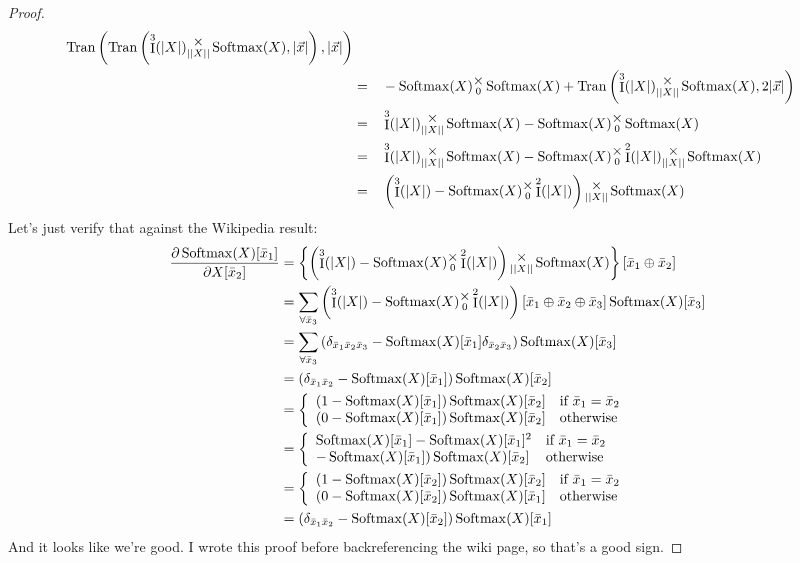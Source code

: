 \documentclass[12pt]{book}
\theoremstyle{definition}
\theoremstyle{plain}
\theoremstyle{ppart}
\theoremstyle{case}
\theoremstyle{solution}
\DeclareMathOperator{\Ident}{I}
\DeclareMathOperator{\Tran}{Tran}
\DeclareMathOperator{\Softmax}{Softmax}
\newcommand{\mmult}[1]{\text{\raisebox{1ex}{$\underset{#1}{\times}$}}}
\begin{document}
\begin{landscape}
\begin{proof}
\begin{alignat}{3}
	\Tran\left(
		\Tran\left(
			\Ident^3(|X|) \mmult{||X||} \Softmax(X)
		,|\vec{x}|
		\right)
	,|\vec{x}|
	\right) \\
	&=&&
	-\Softmax(X) \mmult{0} \Softmax(X)
	+
	\Tran\left(
		\Ident^3(|X|) \mmult{||X||} \Softmax(X)
		,2|\vec{x}|
	\right) \\
	&=&&
	\Ident^3(|X|) \mmult{||X||} \Softmax(X)
  -\Softmax(X) \mmult{0} \Softmax(X) \\
	&=&&
	\Ident^3(|X|) \mmult{||X||} \Softmax(X)
	-\Softmax(X) \mmult{0} \Ident^2(|X|) \mmult{||X||} \Softmax(X) \\
	&=&&
	\left(\Ident^3(|X|) - \Softmax(X) \mmult{0} \Ident^2(|X|) \right)
	\mmult{||X||} \Softmax(X)
\end{alignat}
Let's just verify that against the Wikipedia \cite{wiki:softmax} result:
\begin{align*}
	\frac{\partial \Softmax(X)[\bar{x}_1]}{\partial X[\bar{x}_2]}
	&=
	\left\{
		\left(\Ident^3(|X|) - \Softmax(X) \mmult{0} \Ident^2(|X|) \right)
		\mmult{||X||} \Softmax(X)
	\right\}
	[\bar{x}_1 \oplus \bar{x}_2] \\
	&=
	\sum_{\forall \bar{x}_3}
	\left(\Ident^3(|X|) - \Softmax(X) \mmult{0} \Ident^2(|X|) \right)
	[\bar{x}_1 \oplus \bar{x}_2 \oplus \bar{x}_3]
	\Softmax(X)[\bar{x}_3] \\
	&=
	\sum_{\forall \bar{x}_3}
	\left(
		\delta_{\bar{x}_1 \bar{x}_2 \bar{x}_3}
		- \Softmax(X)[\bar{x}_1] \delta_{\bar{x}_2 \bar{x}_3}
	\right)
	\Softmax(X)[\bar{x}_3] \\
	&=
	(\delta_{\bar{x}_1 \bar{x}_2} - \Softmax(X)[\bar{x}_1])
	\Softmax(X)[\bar{x}_2] \\
	&= \left\{
  \begin{array}{ll}
    (1-\Softmax(X)[\bar{x}_1])\Softmax(X)[\bar{x}_2]
			& \mbox{if } \bar{x}_1 = \bar{x}_2 \\
    (0-\Softmax(X)[\bar{x}_1])\Softmax(X)[\bar{x}_2]
			& \mbox{otherwise}
  \end{array}
	\right. \\
	&= \left\{
  \begin{array}{ll}
    \Softmax(X)[\bar{x}_1]-\Softmax(X)[\bar{x}_1]^2
			& \mbox{if } \bar{x}_1 = \bar{x}_2 \\
    -\Softmax(X)[\bar{x}_1])\Softmax(X)[\bar{x}_2]
			& \mbox{otherwise}
  \end{array}
	\right. \\
	&= \left\{
  \begin{array}{ll}
    (1-\Softmax(X)[\bar{x}_2])\Softmax(X)[\bar{x}_2]
			& \mbox{if } \bar{x}_1 = \bar{x}_2 \\
    (0-\Softmax(X)[\bar{x}_2])\Softmax(X)[\bar{x}_1]
			& \mbox{otherwise}
  \end{array}
	\right. \\
	&= (\delta_{\bar{x}_1 \bar{x}_2} - \Softmax(X)[\bar{x}_2])
	\Softmax(X)[\bar{x}_1]
\end{align*}
And it looks like we're good. I wrote this proof before backreferencing the wiki
page, so that's a good sign.
\end{proof}
\end{landscape}
\end{document}
